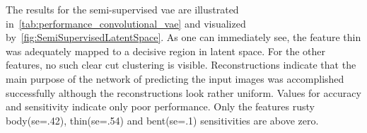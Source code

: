 \begin{table}[!htb]
	\centering
	\caption[Performance of the Semi-Supervised Convolutional Autoencoder]{\textbf{Performance of the Semi-Supervised Convolutional Autoencoder}}
	\label{tab:performance_semi_supervised_autoencoder}
\end{table}

\bigskip
The results for the semi-supervised \acrlong{vae} are illustrated in~\autoref{tab:performance_convolutional_vae} and visualized by~\autoref{fig:SemiSupervisedLatentSpace}. As one can immediately see, the feature thin was adequately mapped to a decisive region in latent space. For the other features, no such clear cut clustering is visible. Reconstructions indicate that the main purpose of the network of predicting the input images was accomplished successfully although the reconstructions look rather uniform. Values for accuracy and sensitivity indicate only poor performance. Only the features rusty body(se=.42), thin(se=.54) and bent(se=.1) sensitivities are above zero.

